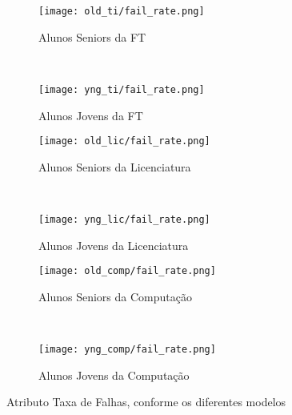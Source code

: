 \clearpage
\begin{figure}[!ht]
    \centering
    \begin{subfigure}[b]{0.48\textwidth}
        \centering
        \texttt{[image: old\_ti/fail\_rate.png]}
        \caption{Alunos Seniors da FT}
    \end{subfigure}
    ~
    \begin{subfigure}[b]{0.48\textwidth}
        \centering
        \texttt{[image: yng\_ti/fail\_rate.png]}
        \caption{Alunos Jovens da FT}
    \end{subfigure}

    \begin{subfigure}[b]{0.48\textwidth}
        \centering
        \texttt{[image: old\_lic/fail\_rate.png]}
        \caption{Alunos Seniors da Licenciatura}
    \end{subfigure}
    ~
    \begin{subfigure}[b]{0.48\textwidth}
        \centering
        \texttt{[image: yng\_lic/fail\_rate.png]}
        \caption{Alunos Jovens da Licenciatura}
    \end{subfigure}

    \begin{subfigure}[b]{0.48\textwidth}
        \centering
        \texttt{[image: old\_comp/fail\_rate.png]}
        \caption{Alunos Seniors da Computação}
    \end{subfigure}
    ~
    \begin{subfigure}[b]{0.48\textwidth}
        \centering
        \texttt{[image: yng\_comp/fail\_rate.png]}
        \caption{Alunos Jovens da Computação}
    \end{subfigure}
    \caption{Atributo Taxa de Falhas, conforme os diferentes modelos}
\end{figure}


